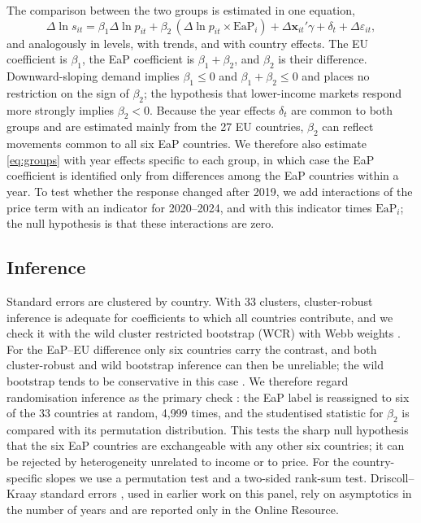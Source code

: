 \documentclass[pdflatex,sn-basic]{sn-jnl}
\begin{document}
The comparison between the two groups is estimated in one equation,
\begin{equation}\label{eq:groups}
\Delta \ln s_{it} = \beta_1 \Delta \ln p_{it} + \beta_2 \,(\Delta \ln p_{it}\times \mathrm{EaP}_i) + \Delta \mathbf{x}_{it}'\gamma + \delta_t + \Delta\varepsilon_{it},
\end{equation}
and analogously in levels, with trends, and with country effects. The EU coefficient is $\beta_1$, the EaP coefficient is $\beta_1+\beta_2$, and $\beta_2$ is their difference. Downward-sloping demand implies $\beta_1\le 0$ and $\beta_1+\beta_2\le 0$ and places no restriction on the sign of $\beta_2$; the hypothesis that lower-income markets respond more strongly implies $\beta_2<0$. Because the year effects $\delta_t$ are common to both groups and are estimated mainly from the 27 EU countries, $\beta_2$ can reflect movements common to all six EaP countries. We therefore also estimate \eqref{eq:groups} with year effects specific to each group, in which case the EaP coefficient is identified only from differences among the EaP countries within a year. To test whether the response changed after 2019, we add interactions of the price term with an indicator for 2020--2024, and with this indicator times $\mathrm{EaP}_i$; the null hypothesis is that these interactions are zero.

\subsection{Inference}

Standard errors are clustered by country. With 33 clusters, cluster-robust inference is adequate for coefficients to which all countries contribute, and we check it with the wild cluster restricted bootstrap (WCR) with Webb weights \citep{cameron2008bootstrap,webb2023reworking}. For the EaP--EU difference only six countries carry the contrast, and both cluster-robust and wild bootstrap inference can then be unreliable; the wild bootstrap tends to be conservative in this case \citep{mackinnon2017wild,mackinnon2018wild}. We therefore regard randomisation inference as the primary check \citep{young2019channeling,conley2011inference}: the EaP label is reassigned to six of the 33 countries at random, 4{,}999 times, and the studentised statistic for $\beta_2$ is compared with its permutation distribution. This tests the sharp null hypothesis that the six EaP countries are exchangeable with any other six countries; it can be rejected by heterogeneity unrelated to income or to price. For the country-specific slopes we use a permutation test and a two-sided rank-sum test. Driscoll--Kraay standard errors \citep{driscoll1998consistent}, used in earlier work on this panel, rely on asymptotics in the number of years and are reported only in the Online Resource.
\end{document}

